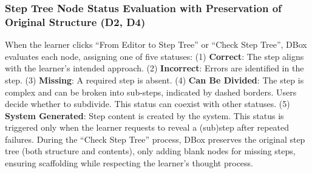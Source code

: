 


\subsubsection{Step Tree Node Status Evaluation with Preservation of Original Structure (D2, D4)}
When the learner clicks ``From Editor to Step Tree'' or ``Check Step Tree'', DBox evaluates each node, assigning one of five statuses:
(1) \textbf{Correct}: The step aligns with the learner's intended approach.
(2) \textbf{Incorrect}: Errors are identified in the step.
(3) \textbf{Missing}: A required step is absent.
(4) \textbf{Can Be Divided}: The step is complex and can be broken into sub-steps, indicated by dashed borders. Users decide whether to subdivide. This status can coexist with other statuses.
(5) \textbf{System Generated}: Step content is created by the system. This status is triggered only when the learner requests to reveal a (sub)step after repeated failures.
During the ``Check Step Tree'' process, DBox preserves the original step tree (both structure and contents), only adding blank nodes for missing steps, ensuring scaffolding while respecting the learner's thought process.





